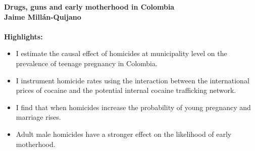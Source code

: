 \documentclass[a4paper]{article}
\begin{document}
	\textbf{Drugs, guns and early motherhood in Colombia} \\
	\textbf{Jaime Mill\'an-Quijano} \\ \\

	\textbf{Highlights:}

	\begin{itemize}
		 \item I estimate the causal effect of homicides at municipality level on the prevalence of teenage pregnancy in Colombia.
		 \item I instrument homicide rates using the interaction between the international prices of cocaine and the potential internal cocaine trafficking network.
		 \item I find that when homicides increase  the probability of young pregnancy and marriage rises. 
		 \item Adult male homicides have a stronger effect on the likelihood of early motherhood. 
	\end{itemize}
\end{document}
